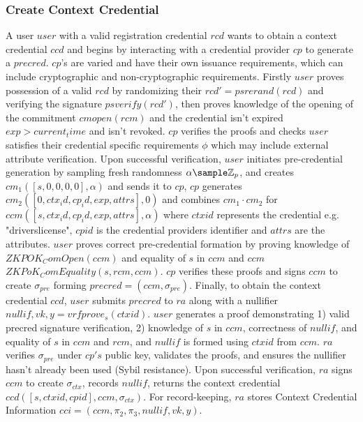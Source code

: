 \subsubsection{Create Context Credential}
A user $user$ with a valid registration credential $rcd$ wants to obtain a context credential $ccd$ and begins by interacting with a credential provider $cp$ to generate a $precred$. $cp$'s are varied and have their own issuance requirements, which can include cryptographic and non-cryptographic requirements.
Firstly $user$ proves possession of a valid $rcd$ by randomizing their $rcd' = psrerand(rcd)$ and verifying the signature $psverify(rcd')$, then proves knowledge of the opening of the commitment $cmopen(rcm)$ and the credential isn't expired $exp > current_time$ and isn't revoked. $cp$ verifies the proofs and checks $user$ satisfies their credential specific requirements $\phi$ which may include external attribute verification.
Upon successful verification, $user$ initiates pre-credential generation by sampling fresh randomness $\alpha \sample \Z_p$, and creates $cm_1([s, 0, 0, 0, 0], \alpha)$ and sends it to $cp$, $cp$ generates $cm_2([0, ctx_id, cp_id, exp, attrs],0)$ and combines $cm_1 \cdot cm_2$ for $ccm([s, ctx_id, cp_id, exp, attrs], \alpha)$ where $ctxid$ represents the credential e.g. "driverslicense", $cpid$ is the credential providers identifier and $attrs$ are the attributes. $user$ proves correct pre-credential formation by proving knowledge of $ZKPOK_ComOpen(ccm)$ and equality of $s$ in $ccm$ and $ccm$ $ZKPoK_ComEquality(s, rcm, ccm)$. $cp$ verifies these proofs and signs $ccm$ to create $\sigma_{pre}$ forming $precred = (ccm, \sigma_{pre})$.
Finally, to obtain the context credential $ccd$, $user$ submits $precred$ to $ra$ along with a nullifier $nullif, vk, y = vrfprove_{s}(ctxid)$. $user$ generates a proof demonstrating 1) valid precred signature verification, 2) knowledge of $s$ in $ccm$, correctness of $nullif$, and equality of $s$ in $ccm$ and $rcm$, and $nullif$ is formed using $ctxid$ from $ccm$.
$ra$ verifies $\sigma_{pre}$ under $cp's$ public key, validates the proofs, and ensures the nullifier hasn't already been used (Sybil resistance). Upon successful verification, $ra$ signs $ccm$ to create $\sigma_{ctx}$, records $nullif$, returns the context credential $ccd([s, ctxid, cpid], ccm, \sigma_{ctx})$.
For record-keeping, $ra$ stores Context Credential Information $cci = (ccm, \pi_2, \pi_3, nullif, vk, y)$.


